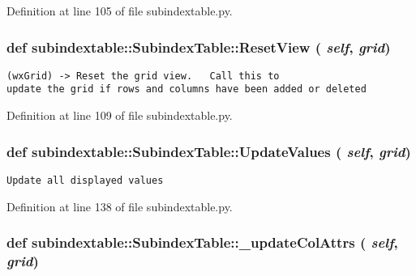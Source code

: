 Definition at line 105 of file subindextable.py.\hypertarget{classsubindextable_1_1SubindexTable_56aaa52f5cbbfd3bf243433b798b10c8}{
\subsubsection[ResetView]{\setlength{\rightskip}{0pt plus 5cm}def subindextable::Subindex\-Table::Reset\-View ( {\em self},  {\em grid})}}
\label{classsubindextable_1_1SubindexTable_56aaa52f5cbbfd3bf243433b798b10c8}




\footnotesize\begin{verbatim}
(wxGrid) -> Reset the grid view.   Call this to
update the grid if rows and columns have been added or deleted
\end{verbatim}
\normalsize
 

Definition at line 109 of file subindextable.py.\hypertarget{classsubindextable_1_1SubindexTable_882d75c01e68c5464cacd8f0b161ecac}{
\subsubsection[UpdateValues]{\setlength{\rightskip}{0pt plus 5cm}def subindextable::Subindex\-Table::Update\-Values ( {\em self},  {\em grid})}}
\label{classsubindextable_1_1SubindexTable_882d75c01e68c5464cacd8f0b161ecac}




\footnotesize\begin{verbatim}Update all displayed values\end{verbatim}
\normalsize
 

Definition at line 138 of file subindextable.py.\hypertarget{classsubindextable_1_1SubindexTable_1ec67dd0580844cc271088320cf5c0fb}{
\subsubsection[\_\-updateColAttrs]{\setlength{\rightskip}{0pt plus 5cm}def subindextable::Subindex\-Table::\_\-update\-Col\-Attrs ( {\em self},  {\em grid})}}
\label{classsubindextable_1_1SubindexTable_1ec67dd0580844cc271088320cf5c0fb}




